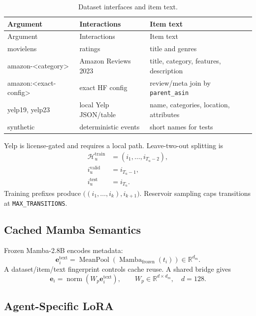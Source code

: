 \documentclass[11pt,a4paper]{article}
\newcommand{\R}{\mathbb{R}}
\begin{document}
\begin{longtable}{p{}p{}p{}}
\caption{Dataset interfaces and item text.}\label{tab:data}\\
\toprule
Argument & Interactions & Item text\\
\midrule
\endfirsthead
\toprule
Argument & Interactions & Item text\\
\midrule
\endhead
movielens & ratings & title and genres\\
amazon-\textless category\textgreater & Amazon Reviews 2023 & title, category, features, description\\
amazon:\textless exact-config\textgreater & exact HF config & review/meta join by \texttt{parent\_asin}\\
yelp19, yelp23 & local Yelp JSON/table & name, categories, location, attributes\\
synthetic & deterministic events & short names for tests\\
\bottomrule
\end{longtable}

Yelp is license-gated and requires a local path. Leave-two-out splitting is
\begin{align}
  \mathcal H_u^{\mathrm{train}}&=(i_1,\ldots,i_{T_u-2}),\\
  i_u^{\mathrm{valid}}&=i_{T_u-1},\\
  i_u^{\mathrm{test}}&=i_{T_u}.
\end{align}
Training prefixes produce $\big((i_1,\ldots,i_k),i_{k+1}\big)$. Reservoir sampling caps transitions at \texttt{MAX\_TRANSITIONS}.

\subsection{Cached Mamba Semantics}

Frozen Mamba-2.8B encodes metadata:
\begin{equation}
  \bm e_i^{\mathrm{text}}
  =
  \operatorname{MeanPool}
  \left(\operatorname{Mamba}_{\mathrm{frozen}}(t_i)\right)
  \in\R^{d_m}.
\end{equation}
A dataset/item/text fingerprint controls cache reuse. A shared bridge gives
\begin{equation}
  \bm e_i=\operatorname{norm}(W_p\bm e_i^{\mathrm{text}}),
  \qquad W_p\in\R^{d\times d_m},\quad d=128.
\end{equation}

\subsection{Agent-Specific LoRA}
\end{document}
